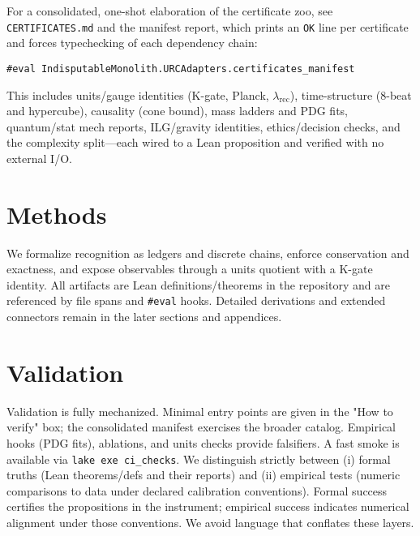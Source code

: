 \documentclass[11pt,a4paper,twoside]{article}
\numberwithin{equation}{section}
\theoremstyle{customthm}
\theoremstyle{customdef}
\theoremstyle{customrem}
\begin{document}
For a consolidated, one-shot elaboration of the certificate zoo, see \texttt{CERTIFICATES.md} and the manifest report, which prints an \texttt{OK} line per certificate and forces typechecking of each dependency chain:

\begin{lstlisting}
#eval IndisputableMonolith.URCAdapters.certificates_manifest
\end{lstlisting}

This includes units/gauge identities (K-gate, Planck, \(\lambda_{\mathrm{rec}}\)), time-structure (8-beat and hypercube), causality (cone bound), mass ladders and PDG fits, quantum/stat mech reports, ILG/gravity identities, ethics/decision checks, and the complexity split—each wired to a Lean proposition and verified with no external I/O.

\section{Methods}

We formalize recognition as ledgers and discrete chains, enforce conservation and exactness, and expose observables through a units quotient with a K-gate identity. All artifacts are Lean definitions/theorems in the repository and are referenced by file spans and \texttt{\#eval} hooks. Detailed derivations and extended connectors remain in the later sections and appendices.

\section{Validation}

Validation is fully mechanized. Minimal entry points are given in the "How to verify" box; the consolidated manifest exercises the broader catalog. Empirical hooks (PDG fits), ablations, and units checks provide falsifiers. A fast smoke is available via \texttt{lake exe ci\_checks}. We distinguish strictly between (i) formal truths (Lean theorems/defs and their reports) and (ii) empirical tests (numeric comparisons to data under declared calibration conventions). Formal success certifies the propositions in the instrument; empirical success indicates numerical alignment under those conventions. We avoid language that conflates these layers.

\end{document}
